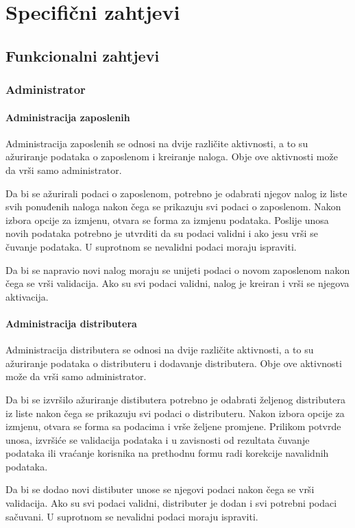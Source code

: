 \chapter{Specifični zahtjevi}
\label{poglavlje3}


\section{Funkcionalni zahtjevi}
\subsection{Administrator}
\subsubsection{Administracija zaposlenih}
Administracija zaposlenih se odnosi na dvije različite aktivnosti, a to su ažuriranje podataka o 
zaposlenom i kreiranje naloga. Obje ove aktivnosti može da vrši samo administrator.

Da bi se ažurirali podaci o zaposlenom, potrebno je odabrati njegov nalog iz liste svih ponuđenih naloga nakon 
čega se prikazuju svi podaci o zaposlenom. Nakon izbora opcije za izmjenu, otvara se forma za izmjenu podataka. 
Poslije unosa novih podataka potrebno je utvrditi da su podaci validni i ako jesu vrši se čuvanje podataka. 
U suprotnom se nevalidni podaci moraju ispraviti. 

Da bi se napravio novi nalog moraju se unijeti podaci o novom zaposlenom nakon čega se vrši validacija. Ako su 
svi podaci validni, nalog je kreiran i vrši se njegova aktivacija.

\subsubsection{Administracija distributera}
Administracija distributera se odnosi na dvije različite aktivnosti, a to su ažuriranje podataka 
o distributeru i dodavanje distributera. Obje ove aktivnosti može da vrši samo administrator.

Da bi se izvršilo ažuriranje distibutera potrebno je odabrati željenog distributera iz liste nakon čega se prikazuju  svi
podaci o distributeru. Nakon izbora opcije za izmjenu, otvara se forma sa 
podacima i vrše željene promjene. Prilikom potvrde unosa, izvršiće se validacija podataka i u zavisnosti od rezultata 
čuvanje podataka ili vraćanje korisnika na prethodnu formu radi korekcije navalidnih podataka.

Da bi se dodao novi distibuter unose se njegovi podaci nakon čega se vrši validacija. Ako su svi podaci validni, 
distributer je dodan i svi potrebni podaci sačuvani. U suprotnom se nevalidni podaci moraju ispraviti. 


